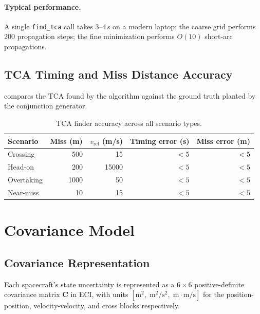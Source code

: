\documentclass[11pt]{article}
\begin{document}
\paragraph{Typical performance.}
A single \texttt{find\_tca} call takes 3--4\,s on a modern laptop: the coarse
grid performs 200 propagation steps; the fine minimization performs
$O(10)$ short-arc propagations.

\subsection{TCA Timing and Miss Distance Accuracy}

 compares the TCA found by the algorithm against the
ground truth planted by the conjunction generator.

\begin{table}[h]
\centering
\caption{TCA finder accuracy across all scenario types.}
\label{tab:tca_accuracy}
\begin{tabular}{lrrrr}
  \toprule
  Scenario & Miss (m) & $v_\text{rel}$ (m/s) & Timing error (s) & Miss error (m) \\
  \midrule
  Crossing   & 500 & 15 & $<5$ & $<5$ \\
  Head-on    & 200 & 15000 & $<5$ & $<5$ \\
  Overtaking & 1000 & 50 & $<5$ & $<5$ \\
  Near-miss  & 10 & 15 & $<5$ & $<5$ \\
  \bottomrule
\end{tabular}
\end{table}

\section{Covariance Model}
\label{sec:covariance}

\subsection{Covariance Representation}

Each spacecraft's state uncertainty is represented as a $6\times6$
positive-definite covariance matrix $\mathbf{C}$ in ECI, with units
$[\text{m}^2,\;\text{m}^2/\text{s}^2,\;\text{m}\cdot\text{m/s}]$ for the
position-position, velocity-velocity, and cross blocks respectively.
\end{document}
